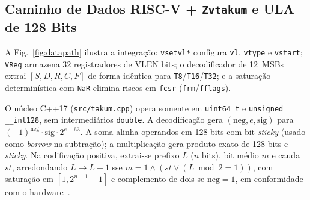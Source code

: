 \documentclass[conference]{IEEEtran}
\begin{document}
\subsection{Caminho de Dados RISC-V + \texttt{Zvtakum} e ULA de 128 Bits}
A Fig.~\ref{fig:datapath} ilustra a integra\c{c}\~ao: \texttt{vsetvl*} configura \texttt{vl}, \texttt{vtype} e \texttt{vstart}; \texttt{VReg} armazena 32 registradores de $\mathrm{VLEN}$ bits; o decodificador de 12~MSBs extrai $[S,D,R,C,F]$ de forma id\^entica para \texttt{T8}/\texttt{T16}/\texttt{T32}; e a satura\c{c}\~ao determin\'istica com \texttt{NaR} elimina riscos em \texttt{fcsr} (\texttt{frm}/\texttt{fflags}).

O n\'ucleo C++17 (\texttt{src/takum.cpp}) opera somente em \texttt{uint64\_t} e \texttt{unsigned \_\_int128}, sem intermedi\'arios \texttt{double}. A decodifica\c{c}\~ao gera $(\mathrm{neg}, e, \mathrm{sig})$ para $(-1)^{\mathrm{neg}}\cdot\mathrm{sig}\cdot 2^{e-63}$. A soma alinha operandos em 128 bits com bit \emph{sticky} (usado como \emph{borrow} na subtra\c{c}\~ao); a multiplica\c{c}\~ao gera produto exato de 128 bits e \emph{sticky}. Na codifica\c{c}\~ao positiva, extrai-se prefixo $L$ ($n$ bits), bit m\'edio $m$ e cauda $\mathit{st}$, arredondando $L\to L+1$ sse $m=1 \land (\mathit{st} \lor (L\bmod 2 = 1))$, com satura\c{c}\~ao em $[1, 2^{n-1}-1]$ e complemento de dois se $\mathrm{neg}=1$, em conformidade com o hardware~\cite{hunhold2024vhdl}.
\end{document}

